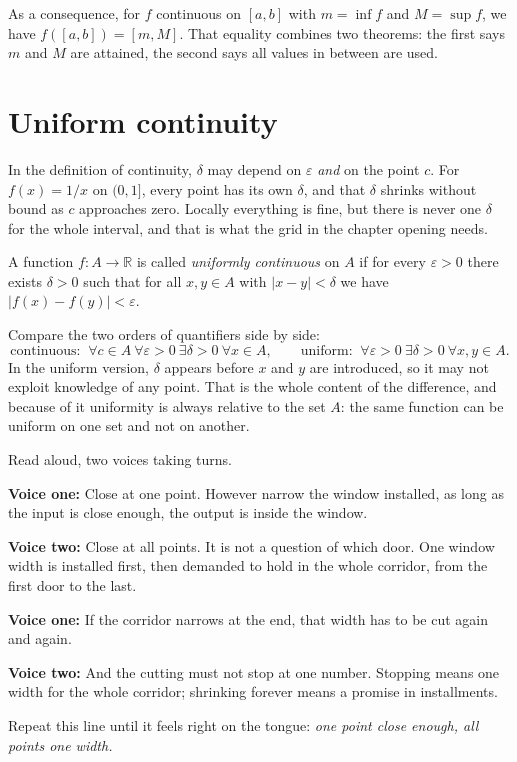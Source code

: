 As a consequence, for $f$ continuous on $[a,b]$ with $m=\inf f$ and $M=\sup f$, we have
$f([a,b])=[m,M]$. That equality combines two theorems: the first says $m$
and $M$ are attained, the second says all values in between are used.

\section{Uniform continuity}

In the definition of continuity, $\delta$ may depend on $\varepsilon$ \emph{and}
on the point $c$. For $f(x)=1/x$ on $(0,1]$, every point has its own $\delta$,
and that $\delta$ shrinks without bound as $c$ approaches zero. Locally
everything is fine, but there is never one $\delta$ for the whole interval, and that is
what the grid in the chapter opening needs.


\begin{definisi}
A function $f\colon A\to\mathbb{R}$ is called \emph{uniformly continuous} on $A$ if for
every $\varepsilon>0$ there exists $\delta>0$ such that for all $x,y\in A$ with
$|x-y|<\delta$ we have $|f(x)-f(y)|<\varepsilon$.
\end{definisi}

Compare the two orders of quantifiers side by side:
\[
\text{continuous: } \ \forall c\in A\ \forall\varepsilon>0\ \exists\delta>0\
\forall x\in A,
\qquad
\text{uniform: } \ \forall\varepsilon>0\ \exists\delta>0\ \forall x,y\in A .
\]
In the uniform version, $\delta$ appears before $x$ and $y$ are introduced, so it may
not exploit knowledge of any point. That is the whole content of the difference, and
because of it uniformity is always relative to the set $A$: the same function can be
uniform on one set and not on another.

\begin{bacakeras}
Read aloud, two voices taking turns.

\textbf{Voice one:} Close at one point. However narrow the window installed, as long as
the input is close enough, the output is inside the window.

\textbf{Voice two:} Close at all points. It is not a question of which door. One window
width is installed first, then demanded to hold in the whole corridor, from the first
door to the last.

\textbf{Voice one:} If the corridor narrows at the end, that width has to be cut again
and again.

\textbf{Voice two:} And the cutting must not stop at one number. Stopping means one width
for the whole corridor; shrinking forever means a promise in installments.

Repeat this line until it feels right on the tongue: \emph{one point close enough, all
points one width.}
\end{bacakeras}

